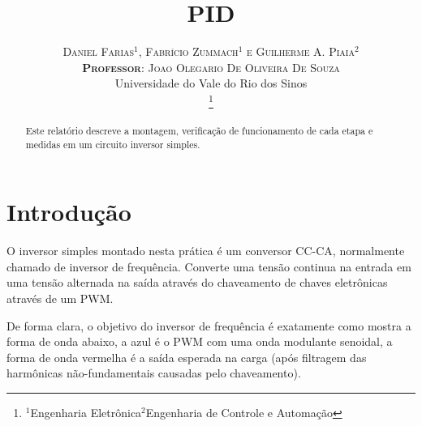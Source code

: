 \documentclass[journal, a4paper]{IEEEtran}
\begin{document}
	\title{PID}
	\author{
	\large
	\textsc{Daniel Farias$^{1}$, Fabrício Zummach$^{1}$ e Guilherme A. Piaia$^{2}$}\\
	\textsc{\textbf{Professor}: Joao Olegario De Oliveira De Souza} \\
	\normalsize Universidade do Vale do Rio dos Sinos \\
	\vspace{-5mm}
    \thanks{$^{1}$Engenharia Eletrônica\newline $^{2}$Engenharia de Controle e Automação}
	}
	\date{}
	\maketitle
  


  
\begin{abstract}
Este relatório descreve a montagem, verificação de funcionamento de cada etapa e medidas em um circuito inversor simples.
\end{abstract}
\section{Introdução}

O inversor simples montado nesta prática é um conversor CC-CA, normalmente chamado de inversor de frequência. Converte uma tensão continua na entrada em uma tensão alternada na saída através do chaveamento de chaves eletrônicas através de um PWM.

De forma clara, o objetivo do inversor de frequência é exatamente como mostra a forma de onda abaixo, a azul é o PWM com uma onda modulante senoidal, a forma de onda vermelha é a saída esperada na carga (após filtragem das harmônicas não-fundamentais causadas pelo chaveamento).
\end{document}
